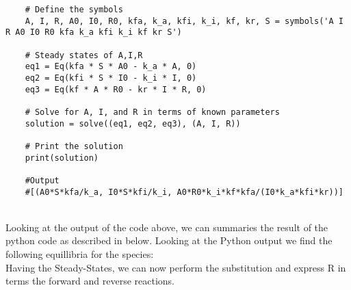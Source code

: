 \documentclass[11pt]{cls/labreport}
\begin{document}
\begin{multicols}{2}
{\begin{codebox}
\begin{lstlisting}
    # Define the symbols
    A, I, R, A0, I0, R0, kfa, k_a, kfi, k_i, kf, kr, S = symbols('A I R A0 I0 R0 kfa k_a kfi k_i kf kr S')
    
    # Steady states of A,I,R
    eq1 = Eq(kfa * S * A0 - k_a * A, 0)  
    eq2 = Eq(kfi * S * I0 - k_i * I, 0) 
    eq3 = Eq(kf * A * R0 - kr * I * R, 0) 
    
    # Solve for A, I, and R in terms of known parameters
    solution = solve((eq1, eq2, eq3), (A, I, R))
    
    # Print the solution
    print(solution)
    
    #Output
    #[(A0*S*kfa/k_a, I0*S*kfi/k_i, A0*R0*k_i*kf*kfa/(I0*k_a*kfi*kr))] 
   \end{lstlisting}
 \end{codebox}
 \noindent\parbox[t]{\textwidth}{}\\
Looking at the output of the code above, we can summaries the result of the python code as described in  below.
\twocolstart
Looking at the Python output we find the following equillibria for the species:
\\[1em]
Having the Steady-States, we can now perform the substitution and express R in terms the forward and reverse reactions.\\


}
\end{multicols}
\end{document}
